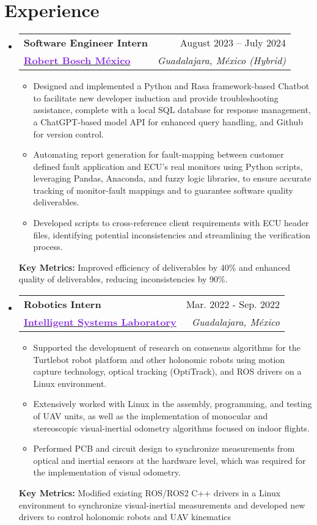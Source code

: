 \documentclass[a4paper,11pt]{article}
\makeatletter
\newcommand{\resumeItem}[1]{
  \item\small{
    {#1 \vspace{-2pt}}
  }
}
\newcommand{\resumeSubheadingNoItalics}[4]{
  \vspace{-2pt}\item
    \begin{tabular*}{0.97\textwidth}[t]{l@{\extracolsep{\fill}}r}
      \textbf{#1} & #2 \\
      \small#3 & \textit{\small #4} \\
    \end{tabular*}\vspace{-7pt}
}
\newcommand{\resumeSubHeadingListStart}{\begin{itemize}[leftmargin=0.15in, label={}]}
\newcommand{\resumeSubHeadingListEnd}{\end{itemize}}
\newcommand{\resumeItemListStart}{\begin{itemize}}
\newcommand{\resumeItemListEnd}{\end{itemize}\vspace{-5pt}}
\makeatother
\begin{document}
\section{\Large{Experience}}
  \resumeSubHeadingListStart
    \resumeSubheadingNoItalics
      {Software Engineer Intern}{August 2023 -- July 2024}
      {\href{https://bosch.com.mx}{\textcolor{BlueViolet}{\textbf{\large{Robert Bosch México}}}}}{Guadalajara, México (Hybrid)}
      \resumeItemListStart
        \resumeItem{Designed and implemented a Python and Rasa framework-based Chatbot to facilitate new developer induction and provide troubleshooting assistance, complete with a local SQL database for response management, a ChatGPT-based model API for enhanced query handling, and Github for version control.}
        \resumeItem{Automating report generation for fault-mapping between customer defined fault application and ECU's  real monitors using Python scripts, leveraging Pandas, Anaconda, and fuzzy logic libraries, to ensure accurate tracking of monitor-fault mappings and to guarantee software quality deliverables.}
        \resumeItem{Developed scripts to cross-reference client requirements with ECU header files, identifying potential inconsistencies and streamlining the verification process.}
      \resumeItemListEnd
      {\textbf{Key Metrics:} Improved efficiency of deliverables by 40\% and enhanced quality of deliverables, reducing inconsistencies by 90\%.}
    \resumeSubheadingNoItalics
      {Robotics Intern}{Mar. 2022 - Sep. 2022}
      {\href{https://www.cucei.udg.mx/carreras/robotica/es/laboratorios/ciber-fisicos}{\textcolor{BlueViolet}{\textbf{\large{Intelligent Systems Laboratory}}}}}{Guadalajara, México}
      \resumeItemListStart
        \resumeItem{Supported the development of research on consensus algorithms for the Turtlebot robot platform and other holonomic robots using motion capture technology, optical tracking (OptiTrack), and ROS drivers on a Linux environment.}
        \resumeItem{Extensively worked with Linux in the assembly, programming, and testing of UAV units, as well as the implementation of monocular and stereoscopic visual-inertial odometry algorithms focused on indoor flights.}
        \resumeItem{Performed PCB and circuit design to synchronize measurements from optical and inertial sensors at the hardware level, which was required for the implementation of visual odometry.}
      \resumeItemListEnd
      {\textbf{Key Metrics:} Modified existing ROS/ROS2 C++ drivers in a Linux environment to synchronize visual-inertial measurements and developed new drivers to control holonomic robots and UAV kinematics}
  \resumeSubHeadingListEnd
\end{document}
